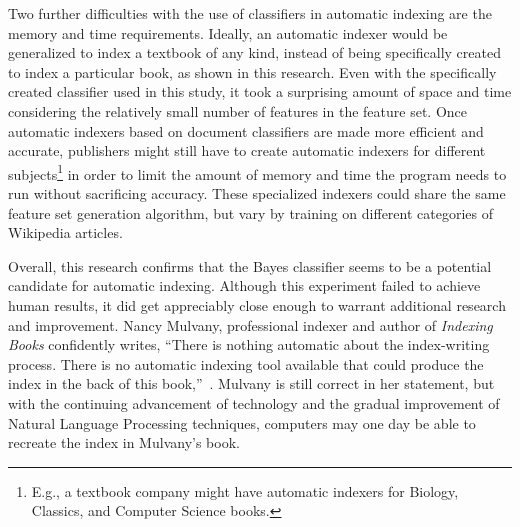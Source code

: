 Two further difficulties with the use of classifiers in automatic indexing are the memory and time requirements.
Ideally, an automatic indexer would be generalized to index a textbook of any kind, instead of being specifically created to index a particular book, as shown in this research.
Even with the specifically created classifier used in this study, it took a surprising amount of space and time considering the relatively small number of features in the feature set.
Once automatic indexers based on document classifiers are made more efficient and accurate, publishers might still have to create automatic indexers for different subjects\footnote{E.g., a textbook company might have automatic indexers for Biology, Classics, and Computer Science books.} in order to limit the amount of memory and time the program needs to run without sacrificing accuracy.
These specialized indexers could share the same feature set generation algorithm, but vary by training on different categories of Wikipedia articles.

Overall, this research confirms that the \naive Bayes classifier seems to be a potential candidate for automatic indexing.
Although this experiment failed to achieve human results, it did get appreciably close enough to warrant additional research and improvement.
Nancy Mulvany, professional indexer and author of {\it Indexing Books} confidently writes, ``There is nothing automatic about the index-writing process.
There is no automatic indexing tool available that could produce the index in the back of this book,''~\cite{mulvany}.
Mulvany is still correct in her statement, but with the continuing advancement of technology and the gradual improvement of Natural Language Processing techniques, computers may one day be able to recreate the index in Mulvany's book.